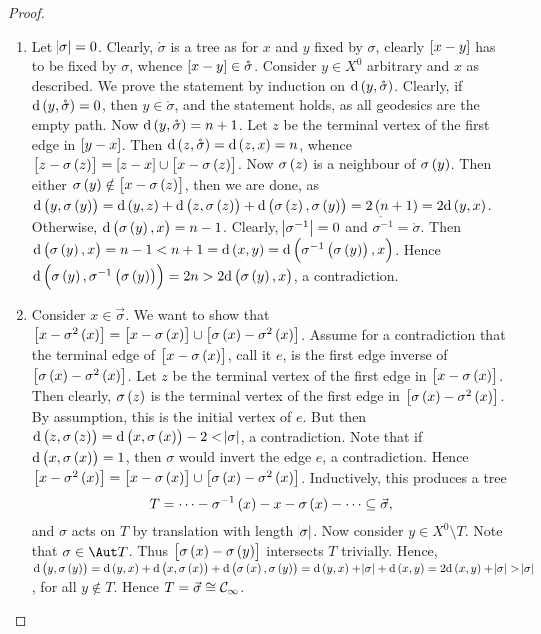 \begin{proof}
\hfill
\begin{enumerate}
\item Let $ \abs{\sigma} = 0 $. Clearly, $ \mathring{\sigma} $ is a tree as for $ x $ and $ y $ fixed by $ \sigma $, clearly $ \sbr{x - y} $ has to be fixed by $ \sigma $, whence $ \sbr{x - y} \in \mathring{\sigma} $. Consider $ y \in X^0 $ arbitrary and $ x $ as described. We prove the statement by induction on $ \d\br{y, \mathring{\sigma}} $. Clearly, if $ \d\br{y, \mathring{\sigma}} = 0 $, then $ y \in \mathring{\sigma} $, and the statement holds, as all geodesics are the empty path. Now $ \d\br{y, \mathring{\sigma}} = n + 1 $. Let $ z $ be the terminal vertex of the first edge in $ \sbr{y - x} $. Then $ \d\br{z, \mathring{\sigma}} = \d\br{z, x} = n $, whence $ \sbr{z - \sigma\br{z}} = \sbr{z - x} \cup \sbr{x - \sigma\br{z}} $. Now $ \sigma\br{z} $ is a neighbour of $ \sigma\br{y} $. Then either $ \sigma\br{y} \notin \sbr{x - \sigma\br{z}} $, then we are done, as $ \d\br{y, \sigma\br{y}} = \d\br{y, z} + \d\br{z, \sigma\br{z}} + \d\br{\sigma\br{z}, \sigma\br{y}} = 2\br{n + 1} = 2\d\br{y, x} $. Otherwise, $ \d\br{\sigma\br{y}, x} = n - 1 $. Clearly, $ \abs{\sigma^{-1}} = 0 $ and $ \mathring{\sigma^{-1}} = \mathring{\sigma} $. Then $ \d\br{\sigma\br{y}, x} = n - 1 < n + 1 = \d\br{x, y} = \d\br{\sigma^{-1}\br{\sigma\br{y}}, x} $. Hence $ \d\br{\sigma\br{y}, \sigma^{-1}\br{\sigma\br{y}}} = 2n > 2\d\br{\sigma\br{y}, x} $, a contradiction.
\item Consider $ x \in \vec{\sigma} $. We want to show that $ \sbr{x - \sigma^2\br{x}} = \sbr{x - \sigma\br{x}} \cup \sbr{\sigma\br{x} - \sigma^2\br{x}} $. Assume for a contradiction that the terminal edge of $ \sbr{x - \sigma\br{x}} $, call it $ e $, is the first edge inverse of $ \sbr{\sigma\br{x} - \sigma^2\br{x}} $. Let $ z $ be the terminal vertex of the first edge in $ \sbr{x - \sigma\br{x}} $. Then clearly, $ \sigma\br{z} $ is the terminal vertex of the first edge in $ \sbr{\sigma\br{x} - \sigma^2\br{x}} $. By assumption, this is the initial vertex of $ e $. But then $ \d\br{z, \sigma\br{z}} = \d\br{x, \sigma\br{x}} - 2 < \abs{\sigma} $, a contradiction. Note that if $ \d\br{x, \sigma\br{x}} = 1 $, then $ \sigma $ would invert the edge $ e $, a contradiction. Hence $ \sbr{x - \sigma^2\br{x}} = \sbr{x - \sigma\br{x}} \cup \sbr{\sigma\br{x} - \sigma^2\br{x}} $. Inductively, this produces a tree
$$ T = \dots - \sigma^{-1}\br{x} - x - \sigma\br{x} - \dots \subseteq \vec{\sigma}, $$
and $ \sigma $ acts on $ T $ by translation with length $ \abs{\sigma} $. Now consider $ y \in X^0 \setminus T $. Note that $ \sigma \in \Aut T $. Thus $ \sbr{\sigma\br{x} - \sigma\br{y}} $ intersects $ T $ trivially. Hence, $ \d\br{y, \sigma\br{y}} = \d\br{y, x} + \d\br{x, \sigma\br{x}} + \d\br{\sigma\br{x}, \sigma\br{y}} = \d\br{y, x} + \abs{\sigma} + \d\br{x, y} = 2\d\br{x, y} + \abs{\sigma} > \abs{\sigma} $, for all $ y \notin T $. Hence $ T = \vec{\sigma} \cong \mathcal{C}_\infty $.
\end{enumerate}
\end{proof}

